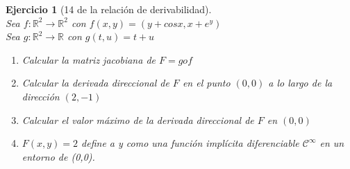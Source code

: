 \documentclass[11pt, a4paper, titlepage]{article}
\newcommand{\R}{\mathbb{R}}
\theoremstyle{exercise-style}
\newtheorem*{ejer}{Ejercicio}
\newenvironment{nlist}
{\begin{enumerate}
\renewcommand\labelenumi{(\emph{\roman{enumi})}}}
{\end{enumerate}}
\theoremstyle{theorem-style}
\begin{document}
\begin{ejer}[14 de la relación de derivabilidad]\hfill\\
	Sea $f: \R^2 \to \R^2$ con $f(x,y) = (y+cosx,x+e^y)$\\
	Sea $g: \R^2 \to \R$ con $g(t,u) = t+u$
	\begin{nlist}
	\item Calcular la matriz jacobiana de $F=gof$
	\item Calcular la derivada direccional de $F$ en el punto $(0,0)$ a lo largo de la dirección $(2,-1)$
	\item Calcular el valor máximo de la derivada direccional de $F$ en $(0,0)$
	\item $F(x,y) = 2$ define a y como una función implícita diferenciable $\mathcal{C}^\infty$ en un entorno de (0,0).
\end{nlist}
\end{ejer}
\end{document}
